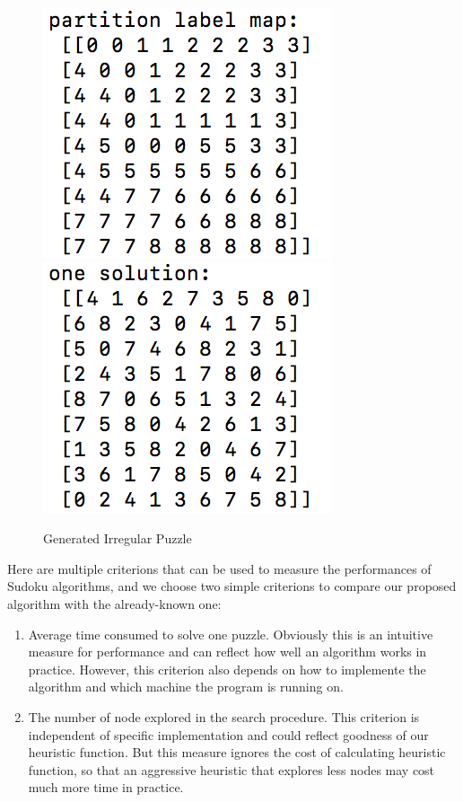 \documentclass[12pt]{article}
\begin{document}
\begin{spacing}{1.1}
\begin{figure}[h!]
	\centering
	\includegraphics{pic5.png}
	\includegraphics{pic6.png}
	\caption{Generated Irregular Puzzle}
	\label{Fig:GenIrreg}
\end{figure}

Here are multiple criterions that can be used to measure the performances of Sudoku algorithms, and we choose two simple criterions to compare our proposed algorithm with the already-known one:
\begin{enumerate}
	\item Average time consumed to solve one puzzle. Obviously this is an intuitive measure for performance and can reflect how well an algorithm works in practice. However, this criterion also depends on how to implemente the algorithm and which machine the program is running on.
	\item The number of node explored in the search procedure. This criterion is independent of specific implementation and could reflect goodness of our heuristic function. But this measure ignores the cost of calculating heuristic function, so that an aggressive heuristic that explores less nodes may cost much more time in practice.
\end{enumerate}


\end{spacing}
\end{document}
